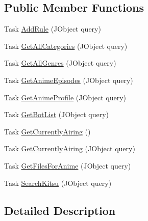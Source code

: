 \subsection*{Public Member Functions}
\begin{DoxyCompactItemize}
\item 
Task \mbox{\hyperlink{interface_little_weeb_library_1_1_services_1_1_i_info_api_web_socket_service_a93dc6813e6d9fbda4710075dc9963a89}{Add\+Rule}} (J\+Object query)
\item 
Task \mbox{\hyperlink{interface_little_weeb_library_1_1_services_1_1_i_info_api_web_socket_service_a9c96d562783b36df84843e6dfe36d049}{Get\+All\+Categories}} (J\+Object query)
\item 
Task \mbox{\hyperlink{interface_little_weeb_library_1_1_services_1_1_i_info_api_web_socket_service_ab5db362889793db2a4371db323876cec}{Get\+All\+Genres}} (J\+Object query)
\item 
Task \mbox{\hyperlink{interface_little_weeb_library_1_1_services_1_1_i_info_api_web_socket_service_aa6af79ecbc2f3f3747416adfa54f1c4a}{Get\+Anime\+Episodes}} (J\+Object query)
\item 
Task \mbox{\hyperlink{interface_little_weeb_library_1_1_services_1_1_i_info_api_web_socket_service_a6aef5d33af6000db81bd9467fd88220f}{Get\+Anime\+Profile}} (J\+Object query)
\item 
Task \mbox{\hyperlink{interface_little_weeb_library_1_1_services_1_1_i_info_api_web_socket_service_acee715ffd1c39bcef083983a15ebe782}{Get\+Bot\+List}} (J\+Object query)
\item 
Task \mbox{\hyperlink{interface_little_weeb_library_1_1_services_1_1_i_info_api_web_socket_service_a1791a3e776fadbc8a72ce23b4d4274b2}{Get\+Currently\+Airing}} ()
\item 
Task \mbox{\hyperlink{interface_little_weeb_library_1_1_services_1_1_i_info_api_web_socket_service_af0c98888bc126df1f8b3c1904c766dc9}{Get\+Currently\+Airing}} (J\+Object query)
\item 
Task \mbox{\hyperlink{interface_little_weeb_library_1_1_services_1_1_i_info_api_web_socket_service_ae8d7dda1099fcb5af57dc702da33024b}{Get\+Files\+For\+Anime}} (J\+Object query)
\item 
Task \mbox{\hyperlink{interface_little_weeb_library_1_1_services_1_1_i_info_api_web_socket_service_ac75ad408fb83a3e0a2d2dc1272dfa355}{Search\+Kitsu}} (J\+Object query)
\end{DoxyCompactItemize}


\subsection{Detailed Description}


